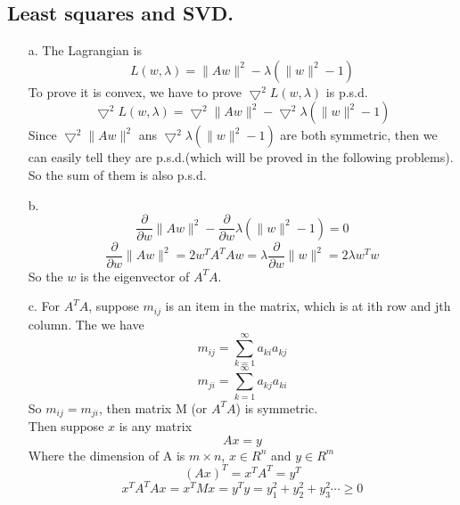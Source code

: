 \documentclass[10pt]{article}
\begin{document}
\subsection{Least squares and SVD.}
\begin{enumerate}
\item[a.] The Lagrangian is \\
\begin{equation}
L(w,\lambda)=\|Aw\|^2-\lambda(\|w\|^2-1)
\end{equation}
To prove it is convex, we have to prove $\bigtriangledown^2L(w,\lambda)$ is p.s.d.
\begin{equation}
\bigtriangledown^2L(w,\lambda)=\bigtriangledown^2\|Aw\|^2-\bigtriangledown^2\lambda(\|w\|^2-1)
\end{equation}
Since $\bigtriangledown^2\|Aw\|^2$ ans $\bigtriangledown^2\lambda(\|w\|^2-1)$ are both symmetric, then we can easily tell they are p.s.d.(which will be proved in the following problems). So the sum of them is also p.s.d.
\item[b.]
\begin{equation}
\frac{\partial}{\partial w} \|Aw\|^2-\frac{\partial}{\partial w} \lambda(\|w\|^2-1)=0
\end{equation}
\begin{equation}
\frac{\partial}{\partial w} \|Aw\|^2=2w^TA^TAw=\lambda\frac{\partial}{\partial w} \|w\|^2=2\lambda w^Tw
\end{equation}
So the $w$ is the eigenvector of $A^TA$.
\item[c.]
For $A^TA$, suppose $m_{ij}$ is an item in the matrix, which is at ith row and jth column. The we have \\
\begin{equation}
m_{ij}=\sum_{k=1}^{\infty}a_{ki}a_{kj}
\end{equation}
\begin{equation}
m_{ji}=\sum_{k=1}^{\infty}a_{kj}a_{ki}
\end{equation}
So $m_{ij}=m_{ji}$, then matrix M (or $A^TA$) is symmetric.\\
Then suppose $x$ is any matrix \\
\begin{equation}
Ax=y
\end{equation}
Where the dimension of A is $m\times n$, $x\in R^n$ and $y\in R^m$
\begin{equation}
(Ax)^T=x^TA^T=y^T
\end{equation}
\begin{equation}
x^TA^TAx=x^TMx=y^Ty=y_1^2+y_2^2+y_3^2\dotsm\geqslant 0

\end{equation}
\end{enumerate}
\end{document}
